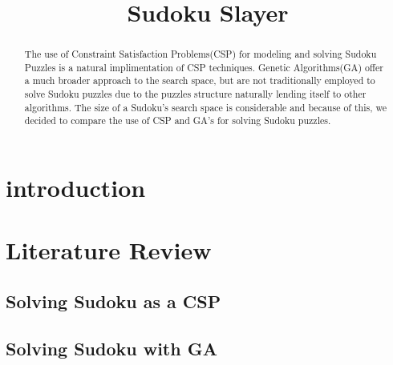 \documentclass[10pt, conference]{IEEEtran}
\begin{document}
\title{Sudoku Slayer}

\author{
\and
{}
}

\maketitle

\begin{abstract}

The use of Constraint Satisfaction Problems(CSP) for modeling and solving Sudoku Puzzles is a natural implimentation of CSP techniques.
Genetic Algorithms(GA) offer a much broader approach to the search space, but are not traditionally employed to solve Sudoku puzzles due to the puzzles structure naturally lending itself to other algorithms.
The size of a Sudoku's search space is considerable and because of this, we decided to compare the use of CSP and GA's for solving Sudoku puzzles.

\end{abstract}

\section{introduction}

\section{Literature Review}

\subsection{Solving Sudoku as a CSP}

\subsection{Solving Sudoku with GA}
\end{document}

